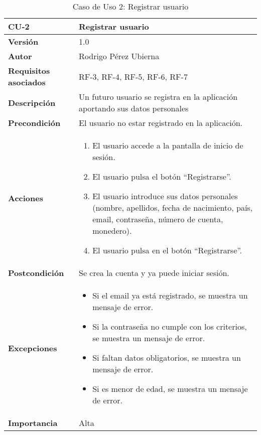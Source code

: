 \begin{table}[p]
	\centering
	\begin{tabularx}{\linewidth}{ p{} p{} }
		\toprule
		\textbf{CU-2} & \textbf{Registrar usuario}\\
		\toprule
		\textbf{Versión} & 1.0 \\
		\textbf{Autor} & Rodrigo Pérez Ubierna \\
		\textbf{Requisitos asociados} & RF-3, RF-4, RF-5, RF-6, RF-7 \\
		\textbf{Descripción} & Un futuro usuario se registra en la aplicación aportando sus datos personales \\
		\textbf{Precondición} & El usuario no estar registrado en la aplicación. \\
		\textbf{Acciones} &
			\begin{enumerate}
				\def\labelenumi{\arabic{enumi}.}
				\tightlist
				\item El usuario accede a la pantalla de inicio de sesión.
				\item El usuario pulsa el botón ``Registrarse''.
				\item El usuario introduce sus datos personales (nombre, apellidos, fecha de nacimiento, país, email, contraseña, número de cuenta, monedero).
				\item El usuario pulsa en el botón ``Registrarse''.
			\end{enumerate}\\
			\textbf{Postcondición} & Se crea la cuenta y ya puede iniciar sesión. \\
			\textbf{Excepciones} &
				\begin{itemize}
					\item Si el email ya está registrado, se muestra un mensaje de error.
					\item Si la contraseña no cumple con los criterios, se muestra un mensaje de error.
					\item Si faltan datos obligatorios, se muestra un mensaje de error.
					\item Si es menor de edad, se muestra un mensaje de error.
				\end{itemize} \\
			\textbf{Importancia} & Alta \\
			\bottomrule
		\end{tabularx}
		\caption{Caso de Uso 2: Registrar usuario}
\end{table}

